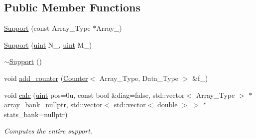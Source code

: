 \subsection*{Public Member Functions}
\begin{DoxyCompactItemize}
\item 
\hyperlink{classbarry_1_1_support_ab946f83af83c571de8bd5a17ce453240}{Support} (const Array\+\_\+\+Type $\ast$Array\+\_\+)
\item 
\hyperlink{classbarry_1_1_support_aa451bd21c09935b686869fef96c5b874}{Support} (\hyperlink{namespacebarry_a11dfc53ddb4672278319aa04f1e09a6c}{uint} N\+\_\+, \hyperlink{namespacebarry_a11dfc53ddb4672278319aa04f1e09a6c}{uint} M\+\_\+)
\item 
\hyperlink{classbarry_1_1_support_a1ffd5ee63fa68338cbbf443e1e54e5b4}{$\sim$\+Support} ()
\item 
void \hyperlink{classbarry_1_1_support_a9fc89bd8b15dcad6a4140a3c74073d10}{add\+\_\+counter} (\hyperlink{classbarry_1_1_counter}{Counter}$<$ Array\+\_\+\+Type, Data\+\_\+\+Type $>$ \&f\+\_\+)
\item 
void \hyperlink{classbarry_1_1_support_ab5261952be0746f188ee024e3e8c26c1}{calc} (\hyperlink{namespacebarry_a11dfc53ddb4672278319aa04f1e09a6c}{uint} pos=0u, const bool \&diag=false, std\+::vector$<$ Array\+\_\+\+Type $>$ $\ast$array\+\_\+bank=nullptr, std\+::vector$<$ std\+::vector$<$ double $>$ $>$ $\ast$stats\+\_\+bank=nullptr)
\begin{DoxyCompactList}\small\item\em Computes the entire support. \end{DoxyCompactList}\end{DoxyCompactItemize}
